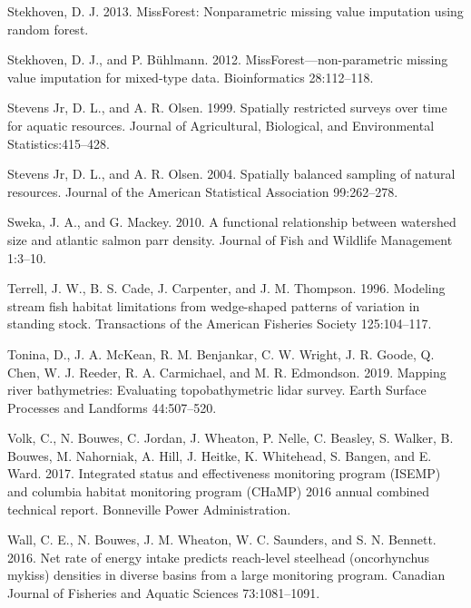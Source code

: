 \documentclass[
  12pt,
]{article}
\begin{document}
\leavevmode\hypertarget{ref-R-missForest}{}%
Stekhoven, D. J. 2013. MissForest: Nonparametric missing value imputation using random forest.

\leavevmode\hypertarget{ref-Stekhoven2012}{}%
Stekhoven, D. J., and P. Bühlmann. 2012. MissForest---non-parametric missing value imputation for mixed-type data. Bioinformatics 28:112--118.

\leavevmode\hypertarget{ref-Stevens1999}{}%
Stevens Jr, D. L., and A. R. Olsen. 1999. Spatially restricted surveys over time for aquatic resources. Journal of Agricultural, Biological, and Environmental Statistics:415--428.

\leavevmode\hypertarget{ref-Stevens2004}{}%
Stevens Jr, D. L., and A. R. Olsen. 2004. Spatially balanced sampling of natural resources. Journal of the American Statistical Association 99:262--278.

\leavevmode\hypertarget{ref-Sweka2010}{}%
Sweka, J. A., and G. Mackey. 2010. A functional relationship between watershed size and atlantic salmon parr density. Journal of Fish and Wildlife Management 1:3--10.

\leavevmode\hypertarget{ref-Terrell1996}{}%
Terrell, J. W., B. S. Cade, J. Carpenter, and J. M. Thompson. 1996. Modeling stream fish habitat limitations from wedge-shaped patterns of variation in standing stock. Transactions of the American Fisheries Society 125:104--117.

\leavevmode\hypertarget{ref-Tonina2019}{}%
Tonina, D., J. A. McKean, R. M. Benjankar, C. W. Wright, J. R. Goode, Q. Chen, W. J. Reeder, R. A. Carmichael, and M. R. Edmondson. 2019. Mapping river bathymetries: Evaluating topobathymetric lidar survey. Earth Surface Processes and Landforms 44:507--520.

\leavevmode\hypertarget{ref-Volk2017}{}%
Volk, C., N. Bouwes, C. Jordan, J. Wheaton, P. Nelle, C. Beasley, S. Walker, B. Bouwes, M. Nahorniak, A. Hill, J. Heitke, K. Whitehead, S. Bangen, and E. Ward. 2017. Integrated status and effectiveness monitoring program (ISEMP) and columbia habitat monitoring program (CHaMP) 2016 annual combined technical report. Bonneville Power Administration.

\leavevmode\hypertarget{ref-Wall2016}{}%
Wall, C. E., N. Bouwes, J. M. Wheaton, W. C. Saunders, and S. N. Bennett. 2016. Net rate of energy intake predicts reach-level steelhead (oncorhynchus mykiss) densities in diverse basins from a large monitoring program. Canadian Journal of Fisheries and Aquatic Sciences 73:1081--1091.
\end{document}
